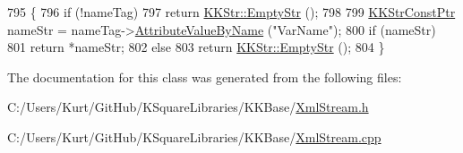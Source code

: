 \begin{DoxyCode}
795 \{
796   \textcolor{keywordflow}{if}  (!nameTag)
797     \textcolor{keywordflow}{return} \hyperlink{class_k_k_b_1_1_k_k_str_ab6e416b3ef54ef632bd10c3f7a2f7994}{KKStr::EmptyStr} ();
798 
799   \hyperlink{class_k_k_b_1_1_k_k_str}{KKStrConstPtr}  nameStr = nameTag->\hyperlink{class_k_k_b_1_1_xml_tag_a0470baf5a49af1c2f6aaf0155b9ba783}{AttributeValueByName} (\textcolor{stringliteral}{"VarName"});
800   \textcolor{keywordflow}{if}  (nameStr)
801     \textcolor{keywordflow}{return}  *nameStr;
802   \textcolor{keywordflow}{else}
803     \textcolor{keywordflow}{return}  \hyperlink{class_k_k_b_1_1_k_k_str_ab6e416b3ef54ef632bd10c3f7a2f7994}{KKStr::EmptyStr} ();
804 \}
\end{DoxyCode}


The documentation for this class was generated from the following files\+:\begin{DoxyCompactItemize}
\item 
C\+:/\+Users/\+Kurt/\+Git\+Hub/\+K\+Square\+Libraries/\+K\+K\+Base/\hyperlink{_xml_stream_8h}{Xml\+Stream.\+h}\item 
C\+:/\+Users/\+Kurt/\+Git\+Hub/\+K\+Square\+Libraries/\+K\+K\+Base/\hyperlink{_xml_stream_8cpp}{Xml\+Stream.\+cpp}\end{DoxyCompactItemize}
